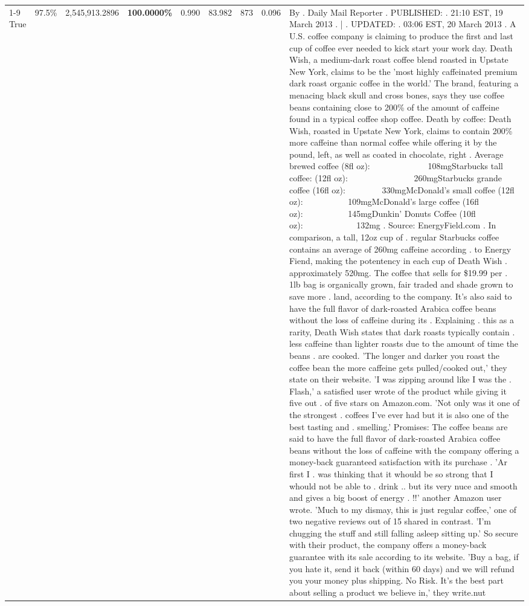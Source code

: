 \begin{table}[H]
{\begin{tabular}{lllrlllll}
\cline{1-9} \cline{2-9}
True & 97.5\% & 2,545,913.2896 & \bfseries \color{red} 100.0000\% & 0.990 & 83.982 & 873 & 0.096 & By . Daily Mail Reporter . PUBLISHED: . 21:10 EST, 19 March 2013 . | . UPDATED: . 03:06 EST, 20 March 2013 . A U.S. coffee company is claiming to produce the first and last cup of coffee ever needed to kick start your work day. Death Wish, a medium-dark roast coffee blend roasted in Upstate New York, claims to be the 'most highly caffeinated premium dark roast organic coffee in the world.' The brand, featuring a menacing black skull and cross bones, says they use coffee beans containing close to 200\% of the amount of caffeine found in a typical coffee shop coffee. Death by coffee: Death Wish, roasted in Upstate New York, claims to contain 200\% more caffeine than normal coffee while offering it by the pound, left, as well as coated in chocolate, right . Average brewed coffee (8fl oz):              108mgStarbucks tall coffee: (12fl oz):                260mgStarbucks grande coffee (16fl oz):         330mgMcDonald's small coffee (12fl oz):           109mgMcDonald's large coffee (16fl oz):           145mgDunkin' Donuts Coffee (10fl oz):             132mg . Source: EnergyField.com . In comparison, a tall, 12oz cup of . regular Starbucks coffee contains an average of 260mg caffeine according . to Energy Fiend, making the potentency in each cup of Death Wish . approximately 520mg. The coffee that sells for \$19.99 per . 1lb bag is organically grown, fair traded and shade grown to save more . land, according to the company. It's also said to have the full flavor of dark-roasted Arabica coffee beans without the loss of caffeine during its . Explaining . this as a rarity, Death Wish states that dark roasts typically contain . less caffeine than lighter roasts due to the amount of time the beans . are cooked. 'The longer and darker you roast the coffee bean the more caffeine gets pulled/cooked out,' they state on their website. 'I was zipping around like I was the . Flash,' a satisfied user wrote of the product while giving it five out . of five stars on Amazon.com. 'Not only was it one of the strongest . coffees I've ever had but it is also one of the best tasting and . smelling.’ Promises: The coffee beans are said to have the full flavor of dark-roasted Arabica coffee beans without the loss of caffeine with the company offering a money-back guaranteed satisfaction with its purchase . 'Ar first I . was thinking that it whould be so strong that I whould not be able to . drink .. but its very nuce and smooth and gives a big boost of energy . !!' another Amazon user wrote. 'Much to my dismay, this is just regular coffee,' one of two negative reviews out of 15 shared in contrast. 'I'm chugging the stuff and still falling asleep sitting up.' So secure with their product, the company offers a money-back guarantee with its sale according to its website. 'Buy a bag, if you hate it, send it back (within 60 days) and we will refund you your money plus shipping. No Risk. It’s the best part about selling a product we believe in,' they write.nut \\

\end{tabular}}
\end{table}
